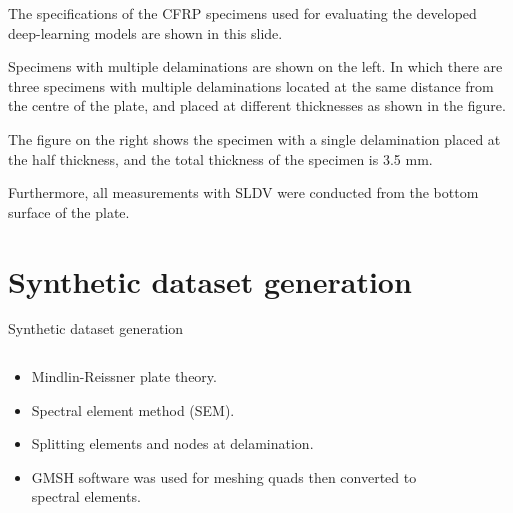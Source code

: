 \documentclass[10pt,aspectratio=169,dvipsnames]{beamer} %
\begin{document}
\note
	{	
		\footnotesize
		The specifications of the CFRP specimens used for evaluating the developed deep-learning models are shown in this slide.
		
		Specimens with multiple delaminations are shown on the left.
		In which there are three specimens with multiple delaminations located at the same distance from the centre of the plate, and placed at different thicknesses as shown in the figure. 
		
		The figure on the right shows the specimen with a single delamination placed at the half thickness, and the total thickness of the specimen is 3.5 mm.
				
		Furthermore, all measurements with SLDV were conducted from the bottom surface of the plate.		
	}	
	\section*{Synthetic dataset generation}
	\setcounter{subfigure}{0}	%
	\begin{frame}{Synthetic dataset generation}
		\begin{columns}[T]			
			\begin{column}{0.55\textwidth}
				\justifying
				\begin{itemize}
					\item Mindlin-Reissner plate theory.
					\item Spectral element method (SEM).
					\item Splitting elements and nodes at delamination.
					\item GMSH software was used for meshing quads then converted to spectral elements.
				\end{itemize}	
				\begin{figure}
				\end{figure}
			\end{column}
			\begin{column}{0.45\textwidth}	
				\begin{figure}
				\end{figure}	
			\end{column}
		\end{columns}	
	\end{frame}
\end{document}

